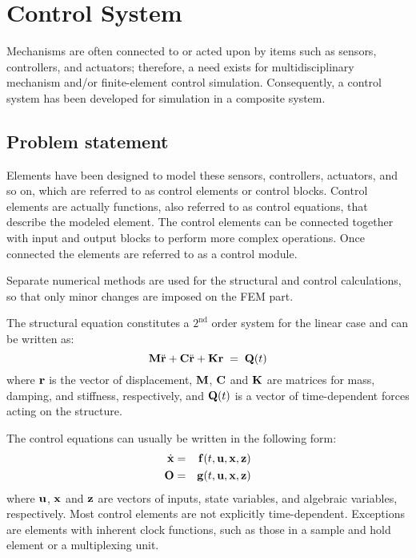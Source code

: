 %
%

%
%

\chapter{Control System}
\label{c:Control System}

Mechanisms are often connected to or acted upon by items such as sensors,
controllers, and actuators; therefore, a need exists for multidisciplinary
mechanism and/or finite-element control simulation.
Consequently, a control system has been developed for simulation in a composite
system.

\section{Problem statement}

Elements have been designed to model these sensors, controllers, actuators,
and so on, which are referred to as control elements or control blocks.
Control elements are actually functions, also referred to as control equations,
that describe the modeled element.
The control elements can be connected together with input and output blocks to
perform more complex operations.
Once connected the elements are referred to as a control module.

Separate numerical methods are used for the structural and control calculations,
so that only minor changes are imposed on the FEM part.

The structural equation constitutes a $2^{\text{nd}}$ order system for the
linear case and can be written as:
%
\begin{equation}
{\bf M} \ddot{\bf r} + {\bf C} \ddot{\bf r} + {\bf Kr} \;=\; {\bf Q}(t)
\label{eqC:91}
\end{equation}
%
where ${\bf r}$ is the vector of displacement, ${\bf M}$, ${\bf C}$ and
${\bf K}$ are matrices for mass, damping, and stiffness, respectively, and
${\bf Q}(t)$ is a vector of time-dependent forces acting on the structure.

The control equations can usually be written in the following form:
%
\begin{eqnarray}
\dot{\bf x} &=& {\bf f}(t,{\bf u},{\bf x},{\bf z}) \\
    {\bf O} &=& {\bf g}(t,{\bf u},{\bf x},{\bf z})
\label{eqC:92}
\end{eqnarray}
%
where $\bf u$, $\bf x$ and $\bf z$ are vectors of inputs, state variables,
and algebraic variables, respectively.
Most control elements are not explicitly time-dependent.
Exceptions are elements with inherent clock functions, such as those in a
sample and hold element or a multiplexing unit.

